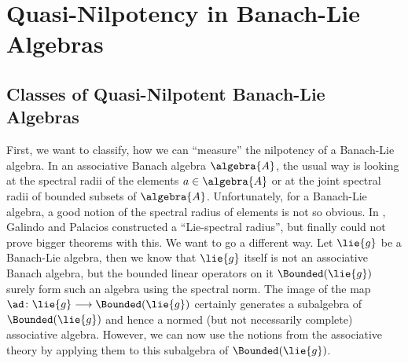 \documentclass[
11pt,                          %
english                        %
]{article}
\begin{document}
\section{Quasi-Nilpotency in Banach-Lie Algebras}
\label{sec:QuasiNilpotency}

\subsection{Classes of Quasi-Nilpotent Banach-Lie Algebras}
First, we want to classify, how we can ``measure'' the nilpotency of a Banach-Lie 
algebra. In an associative Banach algebra $\algebra{A}$, the usual way is looking 
at the spectral radii of the elements $a \in \algebra{A}$ or at the joint spectral 
radii of bounded subsets of $\algebra{A}$. Unfortunately, for a Banach-Lie algebra, 
a good notion of the spectral radius of elements is not so obvious. In 
\cite{galindo.palacios:}, Galindo and Palacios constructed a ``Lie-spectral 
radius'', but finally could not prove bigger theorems with this. We want to go a 
different way. Let $\lie{g}$ be a Banach-Lie algebra, then we know that $\lie{g}$ 
itself is not an associative Banach algebra, but the bounded linear operators on it 
$\Bounded(\lie{g})$ surely form such an algebra using the spectral norm. The image 
of the map $\ad \colon \lie{g} \longrightarrow \Bounded(\lie{g})$ certainly 
generates a subalgebra of $\Bounded(\lie{g})$ and hence a normed (but not 
necessarily complete) associative algebra. However, we can now use the notions from 
the associative theory by applying them to this subalgebra of $\Bounded(\lie{g})$.
\end{document}
